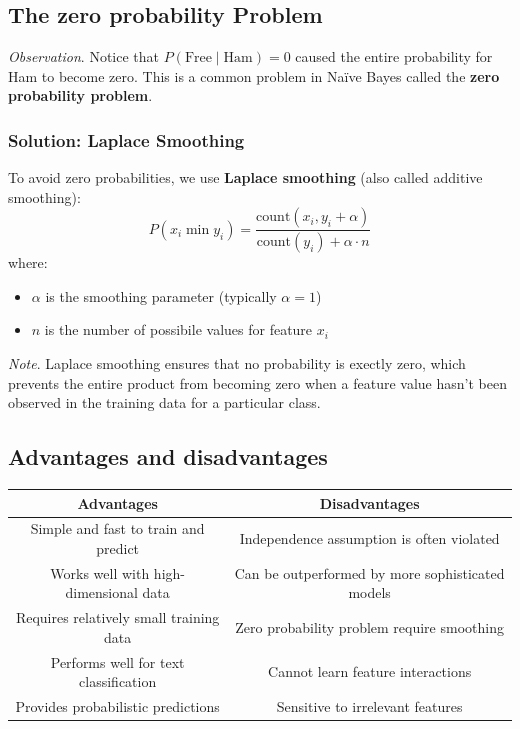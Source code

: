 \documentclass[a4paper]{article}
\theoremstyle{definition}
\begin{document}
\subsection{The zero probability Problem}
\textit{Observation}. Notice that \( P(\text{Free}\mid\text{Ham}) = 0 \) caused the entire probability for Ham to become 
zero. This is a common problem in Naïve Bayes called the \textbf{zero probability problem}.
\subsubsection{Solution: Laplace Smoothing}
To avoid zero probabilities, we use \textbf{Laplace smoothing} (also called additive smoothing):
\[
  P(x_i \min y_i) = \frac{\text{count}(x_i,y_i + \alpha)}{\text{count}(y_i) + \alpha \cdot n}
\]
where:
\begin{itemize}
    \item \( \alpha \) is the smoothing parameter (typically \( \alpha = 1 \))
    \item \( n \) is the number of possibile values for feature \( x_i \)
\end{itemize}
\textit{Note}. Laplace smoothing ensures that no probability is exectly zero, which prevents the entire product from becoming 
zero when a feature value hasn't been observed in the training data for a particular class.
\subsection{Advantages and disadvantages}
\begin{center}
    \begin{tabular}{ |c|c| }
        \hline
        \textbf{Advantages} & \textbf{Disadvantages} \\
        \hline
        Simple and fast to train and predict & Independence assumption is often violated \\
        \hline 
        Works well with high-dimensional data & Can be outperformed by more sophisticated models \\
        \hline 
        Requires relatively small training data & Zero probability problem require smoothing \\
        \hline 
        Performs well for text classification & Cannot learn feature interactions \\
        \hline 
        Provides probabilistic predictions & Sensitive to irrelevant features \\
        \hline
    \end{tabular}
\end{center}
\end{document}
